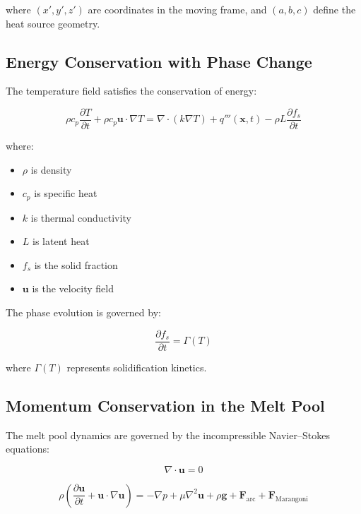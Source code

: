 \documentclass[conference]{IEEEtran}
\begin{document}
where $(x',y',z')$ are coordinates in the moving frame, and $(a,b,c)$ define the heat source geometry.

\subsection{Energy Conservation with Phase Change}

The temperature field satisfies the conservation of energy:

\begin{equation}
\rho c_p \frac{\partial T}{\partial t}
+
\rho c_p \mathbf{u} \cdot \nabla T
=
\nabla \cdot (k \nabla T)
+
q'''(\mathbf{x},t)
-
\rho L \frac{\partial f_s}{\partial t}
\label{eq:energy_full}
\end{equation}

where:

\begin{itemize}
\item $\rho$ is density
\item $c_p$ is specific heat
\item $k$ is thermal conductivity
\item $L$ is latent heat
\item $f_s$ is the solid fraction
\item $\mathbf{u}$ is the velocity field
\end{itemize}

The phase evolution is governed by:

\begin{equation}
\frac{\partial f_s}{\partial t} = \Gamma(T)
\end{equation}

where $\Gamma(T)$ represents solidification kinetics.

\subsection{Momentum Conservation in the Melt Pool}

The melt pool dynamics are governed by the incompressible Navier–Stokes equations:

\begin{equation}
\nabla \cdot \mathbf{u} = 0
\label{eq:continuity}
\end{equation}

\begin{equation}
\rho \left(
\frac{\partial \mathbf{u}}{\partial t}
+
\mathbf{u} \cdot \nabla \mathbf{u}
\right)
=
-\nabla p
+
\mu \nabla^2 \mathbf{u}
+
\rho \mathbf{g}
+
\mathbf{F}_{\mathrm{arc}}
+
\mathbf{F}_{\mathrm{Marangoni}}
\label{eq:momentum_full}
\end{equation}
\end{document}
